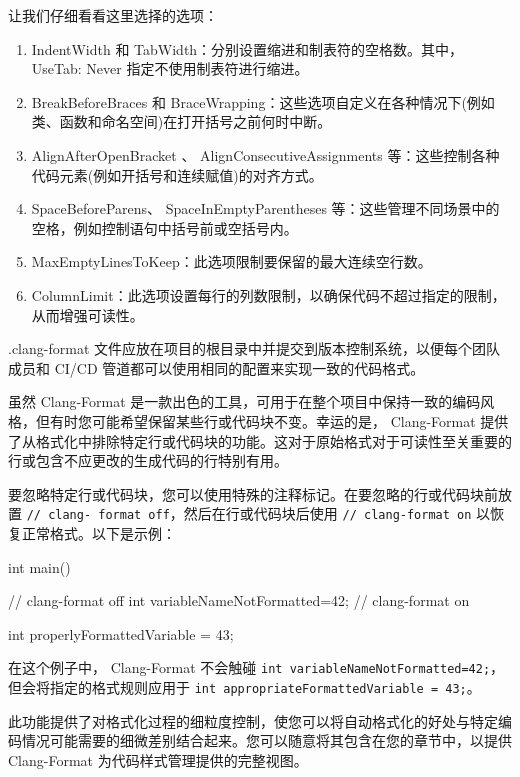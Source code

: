 让我们仔细看看这里选择的选项：

\begin{enumerate}
\item
IndentWidth 和 TabWidth：分别设置缩进和制表符的空格数。其中， UseTab: Never 指定不使用制表符进行缩进。

\item
BreakBeforeBraces 和 BraceWrapping：这些选项自定义在各种情况下(例如类、函数和命名空间)在打开括号之前何时中断。

\item
AlignAfterOpenBracket 、 AlignConsecutiveAssignments 等：这些控制各种代码元素(例如开括号和连续赋值)的对齐方式。

\item
SpaceBeforeParens、 SpaceInEmptyParentheses 等：这些管理不同场景中的空格，例如控制语句中括号前或空括号内。

\item
MaxEmptyLinesToKeep：此选项限制要保留的最大连续空行数。

\item
ColumnLimit：此选项设置每行的列数限制，以确保代码不超过指定的限制，从而增强可读性。
\end{enumerate}

.clang-format 文件应放在项目的根目录中并提交到版本控制系统，以便每个团队成员和 CI/CD 管道都可以使用相同的配置来实现一致的代码格式。


虽然 Clang-Format 是一款出色的工具，可用于在整个项目中保持一致的编码风格，但有时您可能希望保留某些行或代码块不变。幸运的是， Clang-Format 提供了从格式化中排除特定行或代码块的功能。这对于原始格式对于可读性至关重要的行或包含不应更改的生成代码的行特别有用。

要忽略特定行或代码块，您可以使用特殊的注释标记。在要忽略的行或代码块前放置 \verb|// clang- format off|，然后在行或代码块后使用 \verb|// clang-format on| 以恢复正常格式。以下是示例：

\begin{cpp}
int main() {
    // clang-format off
    int variableNameNotFormatted=42;
    // clang-format on

    int properlyFormattedVariable = 43;
}
\end{cpp}

在这个例子中， Clang-Format 不会触碰 \verb|int variableNameNotFormatted=42;|，但会将指定的格式规则应用于 \verb|int appropriateFormattedVariable = 43;|。

此功能提供了对格式化过程的细粒度控制，使您可以将自动格式化的好处与特定编码情况可能需要的细微差别结合起来。您可以随意将其包含在您的章节中，以提供 Clang-Format 为代码样式管理提供的完整视图。

